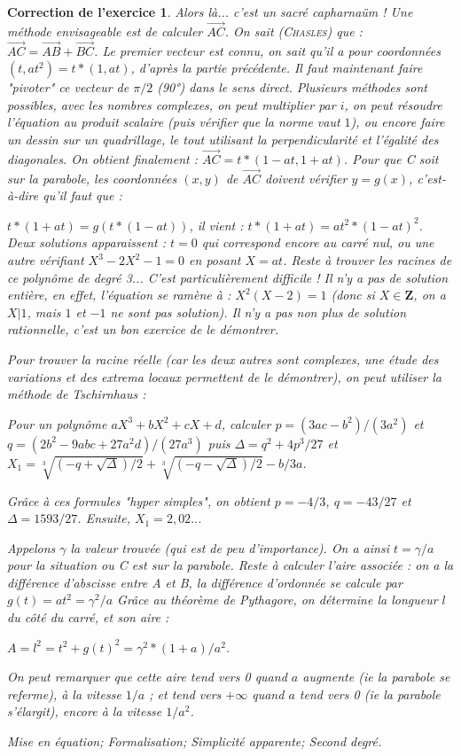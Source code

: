 \documentclass[12pt]{article}
\theoremstyle{break}
\newtheorem{cor}{Correction de l'exercice}
\begin{document}
\begin{cor}
Alors là... c'est un sacré capharnaüm ! Une méthode envisageable est de calculer $\overrightarrow{AC}$. On sait (\textsc{Chasles}) que : $\overrightarrow{AC} = \overrightarrow{AB} + \overrightarrow{BC}$. Le premier vecteur est connu, on sait qu'il a pour coordonnées $(t, a t^2) = t * (1, a t)$, d'après la partie précédente. Il faut maintenant faire "pivoter" ce vecteur de $\pi/2$ (90°) dans le sens direct. Plusieurs méthodes sont possibles, avec les nombres complexes, on peut multiplier par $i$, on peut résoudre l'équation au produit scalaire (puis vérifier que la norme vaut $1$), ou encore faire un dessin sur un quadrillage, le tout utilisant la perpendicularité et l'égalité des diagonales. On obtient finalement : $\overrightarrow{AC} = t * (1-a t, 1+a t)$. Pour que C soit sur la parabole, les coordonnées $(x, y)$ de $\overrightarrow{AC}$ doivent vérifier $y = g(x)$, c'est-à-dire qu'il faut que : 

$t * (1+a t) = g(t * (1-a t))$, il vient : $t * (1+a t) = a t^2 * (1-a t)^2$. Deux solutions apparaissent : $t = 0$ qui correspond encore au carré nul, ou une autre vérifiant $X^3 - 2 X^2 - 1 = 0$ en posant $X = a t$. Reste à trouver les racines de ce polynôme de degré 3... C'est particulièrement difficile ! Il n'y a pas de solution entière, en effet, l'équation se ramène à : $X^2 (X-2) = 1$ (donc si $X \in \textbf{Z}$, on a $X | 1$, mais $1$ et $-1$ ne sont pas solution). Il n'y a pas non plus de solution rationnelle, c'est un bon exercice de le démontrer.

Pour trouver la racine réelle (car les deux autres sont complexes, une étude des variations et des extrema locaux permettent de le démontrer), on peut utiliser la méthode de Tschirnhaus :

Pour un polynôme $a X^3 + b X^2 + c X + d$, calculer $p = (3 a c - b^2)/(3 a^2)$ et $q = (2 b^2 - 9 a b c +27 a^2 d)/(27 a^3)$ puis $\Delta = q^2 + 4 p^3 / 27$ et $X_1 = \sqrt[3]{(-q+\sqrt{\Delta})/2} + \sqrt[3]{(-q-\sqrt{\Delta})/2} - b/3 a$.

Grâce à ces formules "hyper simples", on obtient $p = -4/3$, $q = -43/27$ et $\Delta = 1593/27$. Ensuite, $X_1 = 2,02..$. 

Appelons $\gamma$ la valeur trouvée (qui est de peu d'importance). On a ainsi $t = \gamma / a$ pour la situation ou C est sur la parabole. Reste à calculer l'aire associée : on a la différence d'abscisse entre A et B, la différence d'ordonnée se calcule par $g(t) = a t^2 = \gamma^2 / a$ Grâce au théorème de Pythagore, on détermine la longueur $l$ du côté du carré, et son aire :

$A = l^2 = t^2 + g(t)^2 = \gamma^2 * (1+a) /a^2$.

On peut remarquer que cette aire tend vers 0 quand $a$ augmente (ie la parabole se referme), à la vitesse $1/a$ ; et tend vers $+\infty$ quand $a$ tend vers 0 (ie la parabole s'élargit), encore à la vitesse $1/a^2$.\newline

\textit{Mise en équation; Formalisation; Simplicité apparente; Second degré.}

\end{cor}
\end{document}
